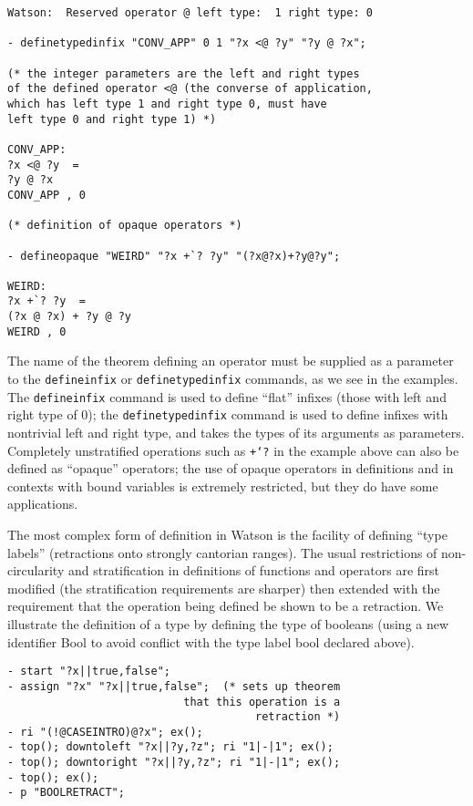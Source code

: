\documentclass{kluwer}
\begin{document}
\begin{article}
\begin{verbatim}
Watson:  Reserved operator @ left type:  1 right type: 0

- definetypedinfix "CONV_APP" 0 1 "?x <@ ?y" "?y @ ?x";

(* the integer parameters are the left and right types 
of the defined operator <@ (the converse of application, 
which has left type 1 and right type 0, must have 
left type 0 and right type 1) *)

CONV_APP:  
?x <@ ?y  =  
?y @ ?x
CONV_APP , 0

(* definition of opaque operators *)

- defineopaque "WEIRD" "?x +`? ?y" "(?x@?x)+?y@?y";

WEIRD:  
?x +`? ?y  =  
(?x @ ?x) + ?y @ ?y
WEIRD , 0
\end{verbatim}

The name of the theorem defining an operator must be supplied as a
parameter to the {\tt defineinfix} or {\tt definetypedinfix} commands,
as we see in the examples.  The {\tt defineinfix} command is used to
define ``flat'' infixes (those with left and right type of 0); the
{\tt definetypedinfix} command is used to define infixes with
nontrivial left and right type, and takes the types of its arguments
as parameters.  Completely unstratified operations such as {\tt +`?}
in the example above can also be defined as ``opaque'' operators; the
use of opaque operators in definitions and in contexts with bound
variables is extremely restricted, but they do have some applications.

The most complex form of definition in Watson is the facility of defining
``type labels'' (retractions onto strongly cantorian ranges).  The usual
restrictions of non-circularity and stratification in definitions of
functions and operators are first modified (the stratification requirements
are sharper) then extended with the requirement that the operation being
defined be shown to be a retraction.  We illustrate the definition of 
a type by defining the type of booleans (using a new identifier Bool
to avoid conflict with the type label bool declared above).


\begin{verbatim}
- start "?x||true,false";
- assign "?x" "?x||true,false";  (* sets up theorem 
                           that this operation is a 
                                      retraction *)
- ri "(!@CASEINTRO)@?x"; ex();
- top(); downtoleft "?x||?y,?z"; ri "1|-|1"; ex();
- top(); downtoright "?x||?y,?z"; ri "1|-|1"; ex();
- top(); ex();
- p "BOOLRETRACT";


\end{verbatim}
\end{article}
\end{document}
